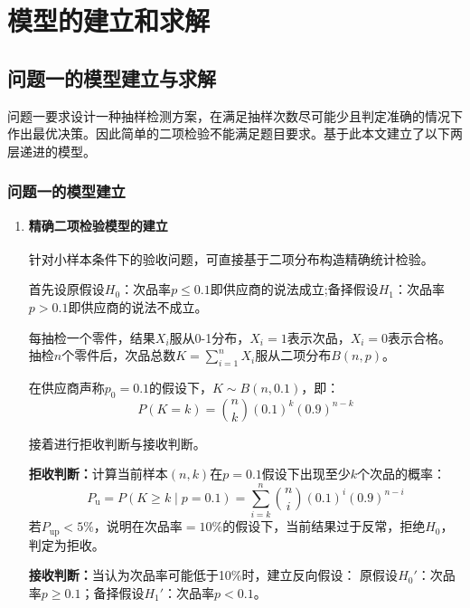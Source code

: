 \documentclass[withoutpreface,bwprint]{cumcmthesis}
\numberwithin{equation}{section}
\begin{document}
\section{模型的建立和求解}
\subsection{问题一的模型建立与求解}
问题一要求设计一种抽样检测方案，在满足抽样次数尽可能少且判定准确的情况下作出最优决策。因此简单的二项检验不能满足题目要求。基于此本文建立了以下两层递进的模型。
\subsubsection{问题一的模型建立}
\begin{enumerate}[itemindent=2em]
    \item \textbf{精确二项检验模型的建立}

    \hspace{2em}针对小样本条件下的验收问题，可直接基于二项分布构造精确统计检验\textsuperscript{\cite{ding2026}}。

    \hspace{2em}首先设原假设$H_0$：次品率$p \leq 0.1$即供应商的说法成立;备择假设$H_1$：次品率$p > 0.1$即供应商的说法不成立。

    \hspace{2em}每抽检一个零件，结果$X_i$服从0-1分布，$X_i=1$表示次品，$X_i=0$表示合格。抽检$n$个零件后，次品总数$K=\sum_{i=1}^{n}X_i$服从二项分布$B(n,p)$。

    \hspace{2em}在供应商声称$p_0=0.1$的假设下，$K \sim B(n,0.1)$，即：
    \begin{equation}
        P(K=k) = \binom{n}{k} (0.1)^k (0.9)^{n-k}
    \end{equation}

    \hspace{2em}接着进行拒收判断与接收判断。

    \hspace{2em}\textbf{拒收判断：}计算当前样本$(n,k)$在$p=0.1$假设下出现至少$k$个次品的概率：
    \begin{equation}
        P_{\text{u}} = P(K \geq k \mid p=0.1) = \sum_{i=k}^{n} \binom{n}{i} (0.1)^i (0.9)^{n-i}
    \end{equation}
    \hspace{2em}若$P_{\text{up}} < 5\%$，说明在次品率$=10\%$的假设下，当前结果过于反常，拒绝$H_0$，判定为拒收。

    \hspace{2em}\textbf{接收判断：}当认为次品率可能低于10\%时，建立反向假设：
    原假设$H_0'$：次品率$p \geq 0.1$；备择假设$H_1'$：次品率$p < 0.1$。


\end{enumerate}
\end{document}

